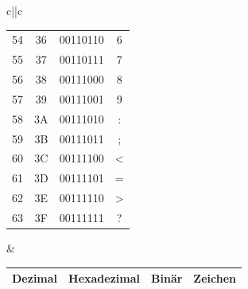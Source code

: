 \begin{table}[H]
{\begin{tabular}{c||c}
\begin{tabular}{cccc}
				54      & 36          & 00110110 & 6       \\
				55      & 37          & 00110111 & 7       \\
				56      & 38          & 00111000 & 8       \\
				57      & 39          & 00111001 & 9       \\
				58      & 3A          & 00111010 & :       \\
				59      & 3B          & 00111011 & ;       \\
				60      & 3C          & 00111100 & <       \\
				61      & 3D          & 00111101 & =       \\
				62      & 3E          & 00111110 & >       \\
				63      & 3F          & 00111111 & ?       \\
			\end{tabular} &
			\begin{tabular}{cccc}
				Dezimal & Hexadezimal & Binär    & Zeichen         \\
				\midrule


\end{tabular}
\end{tabular}}
\end{table}
